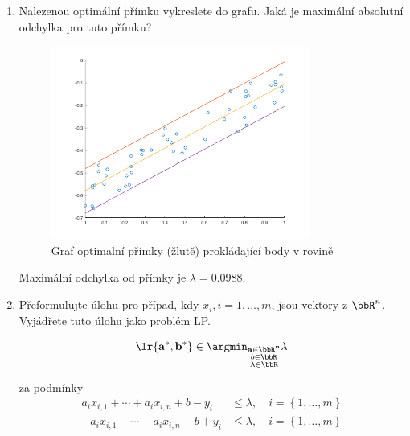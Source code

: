 \begin{enumerate}
    \item Nalezenou optimální přímku vykreslete do grafu. Jaká je maximální absolutní odchylka pro tuto přímku?

    \begin{figure}[H]
        \centering
        \includegraphics[width=0.8\textwidth]{../lp-primky.png}
        \caption{Graf optimalní přímky (žlutě) prokládající body v rovině}
    \end{figure}

    Maximální odchylka od přímky je \( \lambda = 0.0988 \).

    \item Přeformulujte úlohu pro případ, kdy \( x_i, i = 1, \dots, m \), jsou vektory z \( \bbR^n \). Vyjádřete tuto úlohu jako problém LP.

    \[ \lr{\bf{a}^*, b^*} \in \argmin_{\substack{\bf{a} \in \bbR^n \\ b \in \bbR \\ \lambda \in \bbR}} \lambda \]

    za podmínky
    \[
    \begin{array}{rcl}
        a_i x_{i,1} + \cdots + a_i x_{i, n} + b - y_i & \leq \lambda, \quad i = \left\{ 1, \dots, m \right\} \\
        -a_i x_{i,1} - \cdots - a_i x_{i, n} - b + y_i & \leq \lambda, \quad i = \left\{ 1, \dots, m \right\}
    \end{array}
    \]


\end{enumerate}